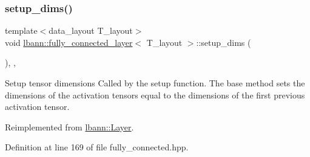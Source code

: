 \mbox{\label{classlbann_1_1fully__connected__layer_aaf38e55b232b1bb2a6336ff1807b5a17}} 
\subsubsection{\texorpdfstring{setup\+\_\+dims()}{setup\_dims()}}
{\footnotesize\ttfamily template$<$data\+\_\+layout T\+\_\+layout$>$ \\
void \hyperlink{classlbann_1_1fully__connected__layer}{lbann\+::fully\+\_\+connected\+\_\+layer}$<$ T\+\_\+layout $>$\+::setup\+\_\+dims (\begin{DoxyParamCaption}{ }\end{DoxyParamCaption})\hspace{0.3cm}{\ttfamily [inline]}, {\ttfamily [override]}, {\ttfamily [virtual]}}

Setup tensor dimensions Called by the setup function. The base method sets the dimensions of the activation tensors equal to the dimensions of the first previous activation tensor. 

Reimplemented from \hyperlink{classlbann_1_1Layer_a90fce1b06c1f2abb480e18cfe08a9746}{lbann\+::\+Layer}.



Definition at line 169 of file fully\+\_\+connected.\+hpp.


